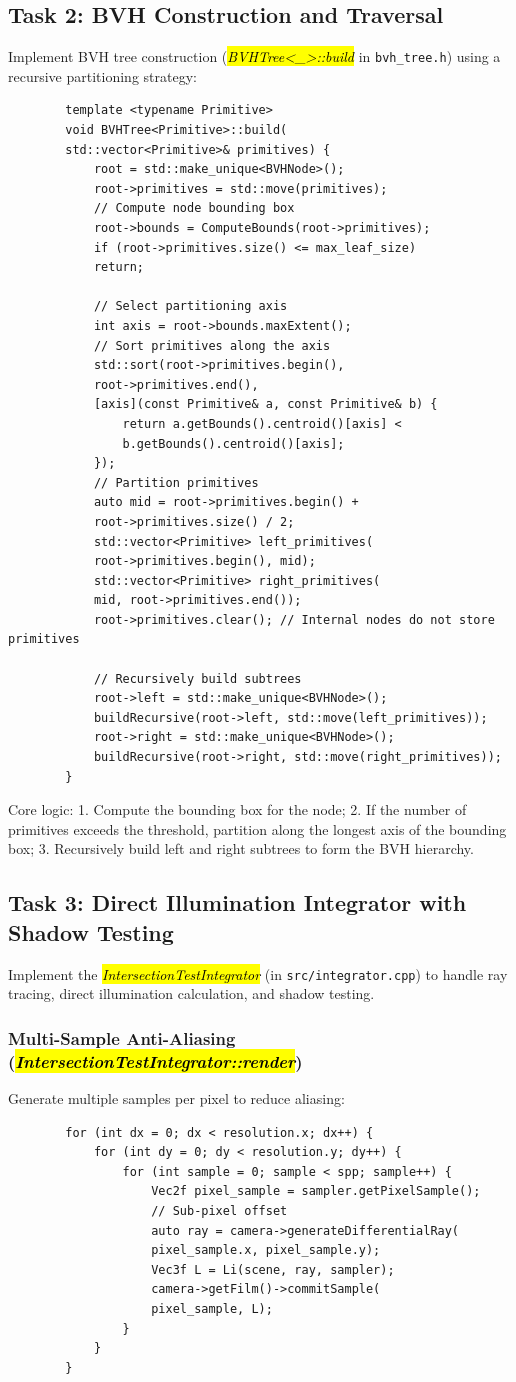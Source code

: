 \documentclass[acmtog]{acmart}
\begin{document}
	\subsection{Task 2: BVH Construction and Traversal}
	Implement BVH tree construction (\hl{\textit{BVHTree<_>::build}} in \texttt{bvh\_tree.h}) using a recursive partitioning strategy:
	\begin{lstlisting}
		template <typename Primitive>
		void BVHTree<Primitive>::build(
		std::vector<Primitive>& primitives) {
			root = std::make_unique<BVHNode>();
			root->primitives = std::move(primitives);
			// Compute node bounding box
			root->bounds = ComputeBounds(root->primitives);
			if (root->primitives.size() <= max_leaf_size) 
			return;
			
			// Select partitioning axis
			int axis = root->bounds.maxExtent();
			// Sort primitives along the axis
			std::sort(root->primitives.begin(), 
			root->primitives.end(),
			[axis](const Primitive& a, const Primitive& b) {
				return a.getBounds().centroid()[axis] < 
				b.getBounds().centroid()[axis];
			});
			// Partition primitives
			auto mid = root->primitives.begin() + 
			root->primitives.size() / 2;
			std::vector<Primitive> left_primitives(
			root->primitives.begin(), mid);
			std::vector<Primitive> right_primitives(
			mid, root->primitives.end());
			root->primitives.clear(); // Internal nodes do not store primitives
			
			// Recursively build subtrees
			root->left = std::make_unique<BVHNode>();
			buildRecursive(root->left, std::move(left_primitives));
			root->right = std::make_unique<BVHNode>();
			buildRecursive(root->right, std::move(right_primitives));
		}
	\end{lstlisting}
	Core logic:
	1. Compute the bounding box for the node;
	2. If the number of primitives exceeds the threshold, partition along the longest axis of the bounding box;
	3. Recursively build left and right subtrees to form the BVH hierarchy.
	
	\subsection{Task 3: Direct Illumination Integrator with Shadow Testing}
	Implement the \hl{\textit{IntersectionTestIntegrator}} (in \texttt{src/integrator.cpp}) to handle ray tracing, direct illumination calculation, and shadow testing.
	
	\subsubsection{Multi-Sample Anti-Aliasing (\hl{\textit{IntersectionTestIntegrator::render}})}
	Generate multiple samples per pixel to reduce aliasing:
	\begin{lstlisting}
		for (int dx = 0; dx < resolution.x; dx++) {
			for (int dy = 0; dy < resolution.y; dy++) {
				for (int sample = 0; sample < spp; sample++) {
					Vec2f pixel_sample = sampler.getPixelSample(); 
					// Sub-pixel offset
					auto ray = camera->generateDifferentialRay(
					pixel_sample.x, pixel_sample.y);
					Vec3f L = Li(scene, ray, sampler);
					camera->getFilm()->commitSample(
					pixel_sample, L);
				}
			}
		}
	\end{lstlisting}
	
\end{document}

